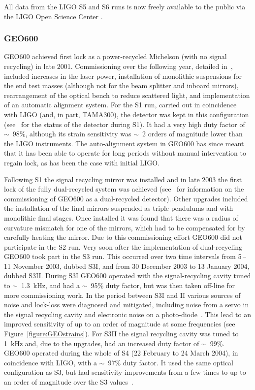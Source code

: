 All data from the LIGO S5 \cite{LOSCS5} and S6 \cite{LOSCS6} runs is now freely available to the public via 
the LIGO Open Science Center \cite{LOSC, 2015JPhCS.610a2021V}.

\subsubsection{GEO600}

GEO600 achieved first lock as a power-recycled Michelson (with no signal recycling) in late 2001. 
Commissioning over the following year, detailed in~\cite{Hewitson:2003}, included increases in the laser
power, installation of monolithic suspensions for the end test masses (although not for the beam splitter and 
inboard mirrors), rearrangement of the optical bench to reduce scattered light, and implementation of an 
automatic alignment system. For the S1 run, carried out in coincidence with LIGO (and, in part, TAMA300), the
detector was kept in this configuration (see~\cite{Abbott:2004a} for the status of the detector during S1). 
It had a very high duty factor of $\sim$~98\%, although its strain sensitivity was $\sim$~2 orders of
magnitude lower than the LIGO instruments. The auto-alignment system in GEO600 has since meant that it has 
been able to operate for long periods without manual intervention to regain lock, as has been the
case with initial LIGO.

Following S1 the signal recycling mirror was installed and in late 2003 the first lock of the fully 
dual-recycled system was achieved (see~\cite{Smith:2004, Willke:2004, Grote:2005} for information on the
commissioning of GEO600 as a dual-recycled detector). Other upgrades included the installation of the final 
mirrors suspended as triple pendulums and with monolithic final stages. Once installed it was found that 
there was a radius of curvature mismatch for one of the mirrors, which had to be compensated for by
carefully heating the mirror. Due to this commissioning effort GEO600 did not participate in the S2 run. Very 
soon after the implementation of dual-recycling GEO600 took part in the S3 run. This occurred over two time 
intervals from 5\,--\,11 November 2003, dubbed S3I, and from 30 December 2003 to 13 January 2004,
dubbed S3II. During S3I GEO600 operated with the signal-recycling cavity tuned to $\sim$~1.3~kHz, and had a 
$\sim$~95\% duty factor, but was then taken off-line for more commissioning work. In the period between S3I 
and II various sources of noise and lock-loss were diagnosed and mitigated, including noise from a servo in 
the signal recycling cavity and electronic noise on a photo-diode~\cite{Smith:2004}. This lead to an improved 
sensitivity of up to an order of magnitude at some frequencies (see Figure~\ref{figure:GEOstrains}). For
S3II the signal recycling cavity was tuned to 1~kHz and, due to the upgrades, had an increased duty factor of 
$\sim$~99\%. GEO600 operated during the whole of S4 (22 February to 24 March 2004), in coincidence with LIGO, 
with a $\sim$~97\% duty factor. It used the same optical configuration as S3, but had sensitivity
improvements from a few times to up to an order of magnitude over the S3 values~\cite{Hild:2006a}.

